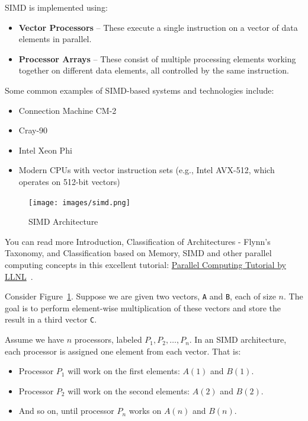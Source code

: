 \documentclass[12pt]{book}
\begin{document}
SIMD is implemented using:

\begin{itemize}
    \item \textbf{Vector Processors} – These execute a single instruction on a vector of data elements in parallel.
    \item \textbf{Processor Arrays} – These consist of multiple processing elements working together on different data elements, all controlled by the same instruction.
\end{itemize}

Some common examples of SIMD-based systems and technologies include:
\begin{itemize}
    \item Connection Machine CM-2
    \item Cray-90
    \item Intel Xeon Phi
    \item Modern CPUs with vector instruction sets (e.g., Intel AVX-512, which operates on 512-bit vectors)
\end{itemize}

\begin{figure}[H]
    \centering
    \texttt{[image: images/simd.png]}
    \caption{SIMD Architecture}
    \label{fig:simd}
\end{figure}

You can read more Introduction, Classification of Architectures - Flynn's Taxonomy, and Classification based on Memory, SIMD and other parallel computing concepts in this excellent tutorial:  
\href{http://www.llnl.gov/computing/tutorials/parallel_comp/}{Parallel Computing Tutorial by LLNL}~\cite{llnl-parallel}.

\bigskip

Consider Figure~\ref{fig:simd}. Suppose we are given two vectors, \texttt{A} and \texttt{B}, each of size $n$. The goal is to perform element-wise multiplication of these vectors and store the result in a third vector \texttt{C}.

Assume we have $n$ processors, labeled $P_1, P_2, \dots, P_n$. In an SIMD architecture, each processor is assigned one element from each vector. That is:

\begin{itemize}
    \item Processor $P_1$ will work on the first elements: $A(1)$ and $B(1)$.
    \item Processor $P_2$ will work on the second elements: $A(2)$ and $B(2)$.
    \item And so on, until processor $P_n$ works on $A(n)$ and $B(n)$.
\end{itemize}
\end{document}
